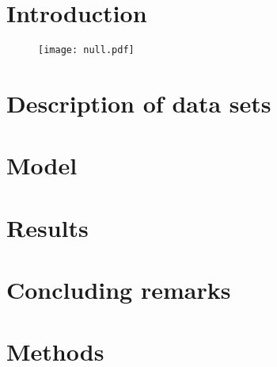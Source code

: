\section{Introduction}
\label{sec:introduction}


\begin{figure}[tp!]
  \centering	
    \texttt{[image: null.pdf]}  
  \caption{
  }
  \label{fig:}
\end{figure}

\section{Description of data sets}
\label{sec:data}


\section{Model}
\label{sec:model}

\section{Results}
\label{sec:results}


\section{Concluding remarks}
\label{sec:concludingremarks}


\section{Methods}
\label{sec:methods}

